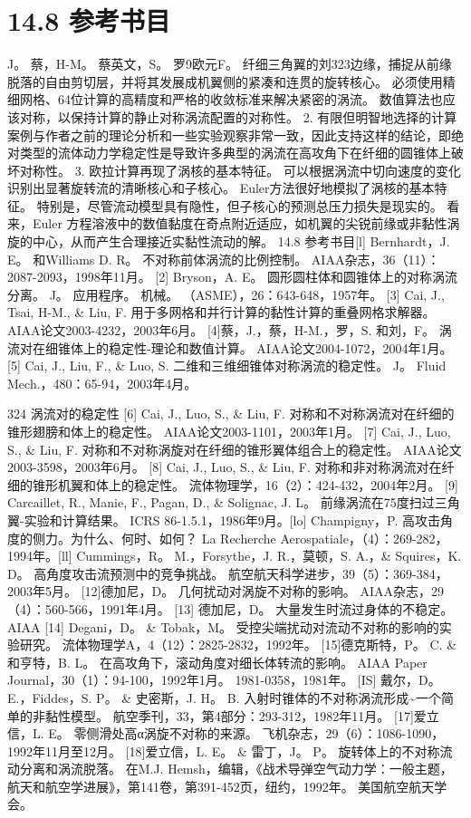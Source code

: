 \documentclass[UTF8,11pt,a4paper,openany,fontset=fandol]{ctexbook}
\begin{document}
\section{14.8 参考书目}
J。 蔡，H-M。 蔡英文，S。 罗9欧元F。 纤细三角翼的刘323边缘，捕捉从前缘脱落的自由剪切层，并将其发展成机翼侧的紧凑和连贯的旋转核心。 必须使用精细网格、64位计算的高精度和严格的收敛标准来解决紧密的涡流。 数值算法也应该对称，以保持计算的静止对称涡流配置的对称性。 2. 有限但明智地选择的计算案例与作者之前的理论分析和一些实验观察非常一致，因此支持这样的结论，即绝对类型的流体动力学稳定性是导致许多典型的涡流在高攻角下在纤细的圆锥体上破坏对称性。 3. 欧拉计算再现了涡核的基本特征。 可以根据涡流中切向速度的变化识别出显著旋转流的清晰核心和子核心。 Euler方法很好地模拟了涡核的基本特征。 特别是，尽管流动模型具有隐性，但子核心的预测总压力损失是现实的。 看来，Euler 方程溶液中的数值黏度在奇点附近适应，如机翼的尖锐前缘或非黏性涡旋的中心，从而产生合理接近实黏性流动的解。 14.8 参考书目[l] Bernhardt，J. E。 和Williams D. R。 不对称前体涡流的比例控制。 AIAA杂志，36（11）：2087-2093，1998年11月。 [2] Bryson，A. E。 圆形圆柱体和圆锥体上的对称涡流分离。 J。 应用程序。 机械。 （ASME），26：643-648，1957年。 [3] Cai, J., Tsai, H-M., \& Liu, F. 用于多网格和并行计算的黏性计算的重叠网格求解器。 AIAA论文2003-4232，2003年6月。 [4]蔡，J.，蔡，H-M.，罗，S. 和刘，F。 涡流对在细锥体上的稳定性-理论和数值计算。 AIAA论文2004-1072，2004年1月。 [5] Cai, J., Liu, F., \& Luo, S. 二维和三维细锥体对称涡流的稳定性。 J。 Fluid Mech.，480：65-94，2003年4月。

324 涡流对的稳定性 [6] Cai, J., Luo, S., \& Liu, F. 对称和不对称涡流对在纤细的锥形翅膀和体上的稳定性。 AIAA论文2003-1101，2003年1月。 [7] Cai, J., Luo, S., \& Liu, F. 对称和不对称涡旋对在纤细的锥形翼体组合上的稳定性。 AIAA论文2003-3598，2003年6月。 [8] Cai, J., Luo, S., \& Liu, F. 对称和非对称涡流对在纤细的锥形机翼和体上的稳定性。 流体物理学，16（2）：424-432，2004年2月。 [9] Carcaillet, R., Manie, F., Pagan, D., \& Solignac, J. L。 前缘涡流在75度扫过三角翼-实验和计算结果。 ICRS 86-1.5.1，1986年9月。[lo] Champigny，P. 高攻击角度的侧力。为什么、何时、如何？ La Recherche Aerospatiale，（4）：269-282，1994年。[ll] Cummings，R。 M.，Forsythe，J. R.，莫顿，S. A.，\& Squires，K. D。 高角度攻击流预测中的竞争挑战。 航空航天科学进步，39（5）：369-384，2003年5月。 [12]德加尼，D。 几何扰动对涡旋不对称的影响。 AIAA杂志，29（4）：560-566，1991年4月。 [13] 德加尼，D。 大量发生时流过身体的不稳定。 AIAA [14] Degani，D。 \& Tobak，M。 受控尖端扰动对流动不对称的影响的实验研究。 流体物理学A，4（12）：2825-2832，1992年。 [15]德克斯特，P。 C. \& 和亨特，B. L。 在高攻角下，滚动角度对细长体转流的影响。 AIAA Paper Journal，30（1）：94-100，1992年1月。 1981-0358，1981年。 [IS] 戴尔，D。 E.，Fiddes，S. P。 \& 史密斯，J. H。 B. 入射时锥体的不对称涡流形成\textasciitilde{}一个简单的非黏性模型。 航空季刊，33，第4部分：293-312，1982年11月。 [17]爱立信，L. E。 零侧滑处高α涡旋不对称的来源。 飞机杂志，29（6）：1086-1090，1992年11月至12月。 [18]爱立信，L. E。 \& 雷丁，J。 P。 旋转体上的不对称流动分离和涡流脱落。 在M.J. Hemsh，编辑，《战术导弹空气动力学：一般主题，航天和航空学进展》，第141卷，第391-452页，纽约，1992年。 美国航空航天学会。
\end{document}
